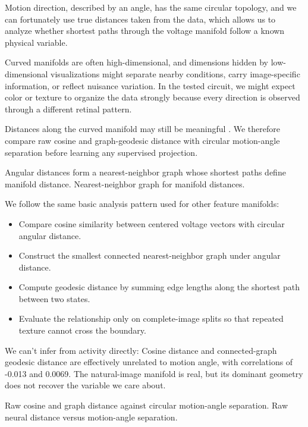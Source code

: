 \documentclass[11pt]{article}
\begin{document}
Motion direction, described by an angle, has the same circular topology, and we can fortunately use true distances taken from the data, which allows us to analyze whether shortest paths through the voltage manifold follow a known physical variable.

Curved manifolds are often high-dimensional, and dimensions hidden by low-dimensional visualizations might separate nearby conditions, carry image-specific information, or reflect nuisance variation. In the tested circuit, we might expect color or texture to organize the data strongly because every direction is observed through a different retinal pattern.

Distances along the curved manifold may still be meaningful \cite{modell2025}. We therefore compare raw cosine and graph-geodesic distance with circular motion-angle separation before learning any supervised projection.

  {Angular distances form a nearest-neighbor graph whose shortest paths define manifold distance.}
  {Nearest-neighbor graph for manifold distances.}

We follow the same basic analysis pattern used for other feature manifolds:

\begin{itemize}
\tightlist
\item Compare cosine similarity between centered voltage vectors with circular angular distance.
\item Construct the smallest connected nearest-neighbor graph under angular distance.
\item Compute geodesic distance by summing edge lengths along the shortest path between two states.
\item Evaluate the relationship only on complete-image splits so that repeated texture cannot cross the boundary.
\end{itemize}

We can't infer from activity directly: Cosine distance and connected-graph geodesic distance are effectively unrelated to motion angle, with correlations of -0.013 and 0.0069. The natural-image manifold is real, but its dominant geometry does not recover the variable we care about.

  {Raw cosine and graph distance against circular motion-angle separation.}
  {Raw neural distance versus motion-angle separation.}
\end{document}
